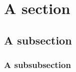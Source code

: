 \documentclass[10pt,twoside,fleqn,french,english]{actuecon}
\author{First Author}
\affil{First Author's Affiliation}
\author{Second Author}
\affil{Second Author's Affiliation}
\date{} %
\begin{document}
	
	
	\captionsetup[table]{format=actuecon}
	\captionsetup[figure]{format=actuecon}
	
	\setcounter{page}{3}
	
	
	\maketitle
	\thispagestyle{empty}			
	
	\begin{AEresume}
	\end{AEresume}

	\begin{AEabstract}
	\end{AEabstract}

	\AEintroduction
	
		       	
	\AEsectionsDeveloppement
	
		\section{A section}
						
		\subsection{A subsection}
								 
		\subsubsection{A subsubsection}
				
	\AEconclusion
	
							
	\AEbibliographie
	
	
		
\end{document}
